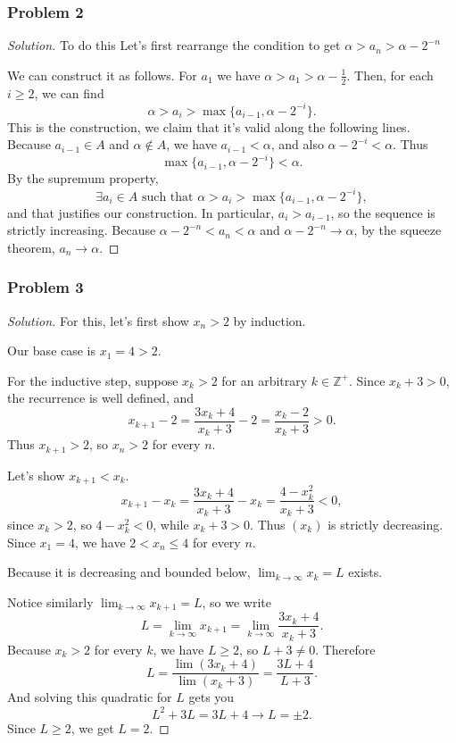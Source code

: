 \documentclass[11pt]{article}
\newcommand{\1}{\mathbf{1}}
\theoremstyle{definition}
\newenvironment{solution}{\begin{proof}[Solution]}{\end{proof}}
\begin{document}
\subsubsection*{Problem 2}
\begin{solution}
    To do this Let's first rearrange the condition to get \(\alpha > a_n > \alpha - 2^{-n}\)
\par We can construct it as follows. For \(a_1\) we have \(\alpha > a_1 > \alpha -
\frac{1}{2}\).
Then, for each \(i\ge 2\), we can find
\[\alpha > a_i > \max\{a_{i-1}, \alpha - 2^{-i}\}.\]
This is the construction, we claim that it's valid along the following lines.
Because \(a_{i-1}\in A\) and \(\alpha\notin A\), we have \(a_{i-1}<\alpha\), and also
\(\alpha-2^{-i}<\alpha\). Thus
\[\max\{a_{i-1},\alpha-2^{-i}\}<\alpha.\]
By the supremum property,
\[\exists a_i \in A \text{ such that } \alpha >  a_i > \max\{a_{i-1}, \alpha - 2^{-i}\},\]
and that justifies our construction. In particular, \(a_i>a_{i-1}\), so the sequence is
strictly increasing.
Because \(\alpha - 2^{-n} < a_n < \alpha \) and \(\alpha - 2^{-n} \rightarrow \alpha\), by
the squeeze theorem, \(a_n \rightarrow \alpha.\)
\end{solution}
\subsubsection*{Problem 3}
\begin{solution}
    For this, let's first show \(x_n > 2\) by induction.
\par Our base case is \(x_1 = 4 > 2.\)
\par For the inductive step, suppose \(x_k > 2\) for an arbitrary \(k \in
\mathbb{Z}^{+}\). Since \(x_k+3>0\), the recurrence is well defined, and
\[
x_{k+1}-2
=
\frac{3x_k+4}{x_k+3}-2
=
\frac{x_k-2}{x_k+3}>0.
\]
Thus \(x_{k+1}>2\), so \(x_n>2\) for every \(n\).
\par Let's show \(x_{k + 1} < x_k.\)
\[
x_{k + 1} - x_k= \frac{3x_k + 4}{x_k + 3} - x_k
= \frac{4-x_k^2}{x_k+3}< 0,
\]
since \(x_k > 2\), so \(4-x_k^2 < 0\), while \(x_k + 3 > 0\).
Thus \((x_k)\) is strictly decreasing. Since \(x_1=4\), we have
\(2<x_n\le 4\) for every \(n\).
\par Because it is decreasing and bounded below, \(\lim_{k\rightarrow \infty} x_k = L\)
exists.
\par Notice similarly \(\lim_{k\rightarrow \infty} x_{k+1} = L\), so we write
\[
L = \lim_{k\rightarrow \infty} x_{k + 1}
= \lim_{k\rightarrow\infty} \frac{3x_k+4}{x_k+3}.
\]
Because \(x_k>2\) for every \(k\), we have \(L\ge 2\), so \(L+3\neq 0\). Therefore
\[
L = \frac{\lim (3x_k + 4)}{\lim (x_k + 3)} = \frac{3L + 4}{L + 3}.
\]
And solving this quadratic for \(L\) gets you
\[
L^2 + 3L = 3L + 4 \rightarrow L= \pm 2.
\]
Since \(L\ge 2\), we get \(L=2\).
\end{solution}
\end{document}
